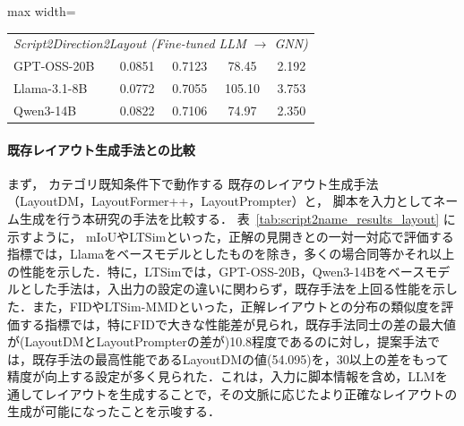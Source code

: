 \documentclass[a4j,12pt,dvipdfmx]{jsreport}
\begin{document}
\begin{table}[htbp]
\begin{adjustbox}{max width=\textwidth}
\begin{tabular}{l c c c c}
         \multicolumn{5}{l}{\itshape Script2Direction2Layout (Fine-tuned LLM $\rightarrow$ GNN)}                                                                              \\

         GPT-OSS-20B
                                                           & 0.0851                                              & 0.7123             & 78.45             & 2.192             \\
         Llama-3.1-8B
                                                           & 0.0772                                              & 0.7055             & 105.10            & 3.753             \\
         Qwen3-14B
                                                           & 0.0822                                              & 0.7106             & 74.97             & 2.350             \\

         \bottomrule
      \end{tabular}
   \end{adjustbox}
\end{table}


\paragraph{既存レイアウト生成手法との比較}
まず，
カテゴリ既知条件下で動作する
既存のレイアウト生成手法（LayoutDM，LayoutFormer++，LayoutPrompter）と，
脚本を入力としてネーム生成を行う本研究の手法を比較する．
表~\ref{tab:script2name_results_layout} に示すように，
mIoUやLTSimといった，正解の見開きとの一対一対応で評価する指標では，Llamaをベースモデルとしたものを除き，多くの場合同等かそれ以上の性能を示した．特に，LTSimでは，GPT-OSS-20B，Qwen3-14Bをベースモデルとした手法は，入出力の設定の違いに関わらず，既存手法を上回る性能を示した．また，FIDやLTSim-MMDといった，正解レイアウトとの分布の類似度を評価する指標では，特にFIDで大きな性能差が見られ，既存手法同士の差の最大値が(LayoutDMとLayoutPrompterの差が)10.8程度であるのに対し，提案手法では，既存手法の最高性能であるLayoutDMの値(54.095)を，30以上の差をもって精度が向上する設定が多く見られた．これは，入力に脚本情報を含め，LLMを通してレイアウトを生成することで，その文脈に応じたより正確なレイアウトの生成が可能になったことを示唆する．
\end{document}
